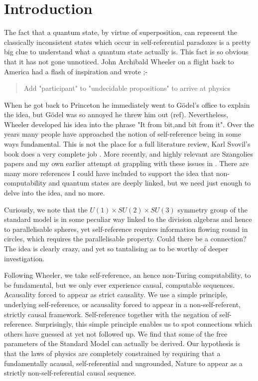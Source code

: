 \documentclass{article}
\theoremstyle{plain}
\theoremstyle{definition}
\theoremstyle{remark}\newtheorem*{remark}{Remark}
\begin{document}
\section{Introduction}
The fact that a quantum state, by virtue of superposition, can represent the classically inconsistent states which occur in self-referential paradoxes is a pretty big clue to understand what a quantum state actually is. This fact is so obvious that it has not gone unnoticed. John Archibald Wheeler on a flight back to America had a flash of inspiration and wrote ;-
\begin{quotation}
  Add "participant" to "undecidable propositions" to arrive at physics
  \par
  \hfill \autocite{wheeler_j_1974}
\end{quotation}
When he got back to Princeton he immediately went to G\"odel's office to explain the idea, but G\"odel was so annoyed he threw him out (ref). Nevertheless, Wheeler developed his idea into the phrase "It from bit,and bit from it". Over the years many people have approached the notion of self-reference being in some ways fundamental. This is not the place for a full literature review, Karl Svovil's book  does a very complete job \autocite{svozil_k_2018}. More recently, and highly relevant are Szangolies papers \autocite{szangolies_2020, szangolies_j_2018, szangolies2025standardmodel, szangolies_j_2021} and my own earlier attempt at grappling with these issues in \autocite{small_2006}. There are many more references I could have included to support the idea that non-computability and quantum states are deeply linked, but we need just enough to delve into the idea, and no more. 

Curiously, we note that the $U(1) \times SU(2) \times SU(3)$ symmetry group of the standard model is in some peculiar way linked to the division algebras and hence to parallelisable spheres, yet self-reference requires information flowing round in circles, which requires the parallelisable property. Could there be a connection? The idea is clearly crazy, and yet so tantalising as to be worthy of deeper investigation.

Following Wheeler, we take self-reference, an hence non-Turing computability, to be fundamental, but we only ever experience causal, computable sequences. Acausality forced to appear as strict causality. We use a simple principle, underlying self-reference, or acausality forced to appear in a non-self-referent, strictly causal framework. Self-reference together with the negation of self-reference. Surprisingly, this simple principle enables us to spot connections which others have guessed at yet not followed up. We find that some of the free parameters of the Standard Model can actually be derived. Our hypothesis is that the laws of physics are completely constrained by requiring that a fundamentally acausal, self-referential and ungrounded, Nature to appear as a strictly non-self-referential causal sequence. 
\end{document}
